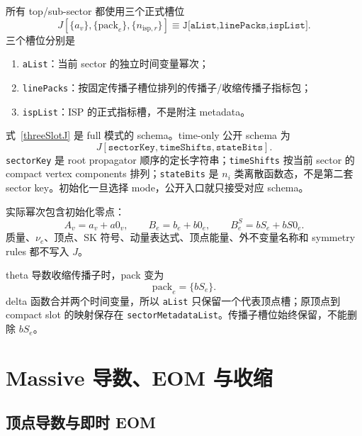 ﻿\documentclass[a4paper,11pt]{article}
\begin{document}
所有 top/sub-sector 都使用三个正式槽位
\begin{equation}
 \boxed{
 J\!\left[
   \{a_v\},
   \{\mathrm{pack}_e\},
   \{n_{\mathrm{isp},r}\}
 \right]}
 \equiv
 \texttt{J[aList,linePacks,ispList]}.
 \label{threeSlotJ}
\end{equation}
三个槽位分别是
\begin{enumerate}
  \item \texttt{aList}：当前 sector 的独立时间变量幂次；
  \item \texttt{linePacks}：按固定传播子槽位排列的传播子/收缩传播子指标包；
  \item \texttt{ispList}：ISP 的正式指标槽，不是附注 metadata。
\end{enumerate}

式~\eqref{threeSlotJ} 是 full 模式的 schema。time-only 公开 schema 为
\begin{equation}
 \boxed{J[\texttt{sectorKey},\texttt{timeShifts},\texttt{stateBits}]}.
 \label{timeOnlyPublicJ}
\end{equation}
\texttt{sectorKey} 是 root propagator 顺序的定长字符串；\texttt{timeShifts} 按当前 sector 的 compact vertex components 排列；\texttt{stateBits} 是 $n_i$ 类离散函数态，不是第二套 sector key。初始化一旦选择 mode，公开入口就只接受对应 schema。

实际幂次包含初始化零点：
\begin{equation}
 A_v=a_v+a0_v,\qquad
 B_e=b_e+b0_e,\qquad
 B^S_e=bS_e+bS0_e.
\end{equation}
质量、$\nu_e$、顶点、SK 符号、动量表达式、顶点能量、外不变量名称和 symmetry rules 都不写入 $J$。

theta 导数收缩传播子时，pack 变为
\begin{equation}
  \mathrm{pack}_e=\{bS_e\}.
\end{equation}
delta 函数合并两个时间变量，所以 \texttt{aList} 只保留一个代表顶点槽；原顶点到 compact slot 的映射保存在 \texttt{sectorMetadataList}。传播子槽位始终保留，不能删除 $bS_e$。

\section{Massive 导数、EOM 与收缩}

\subsection{顶点导数与即时 EOM}
\end{document}
